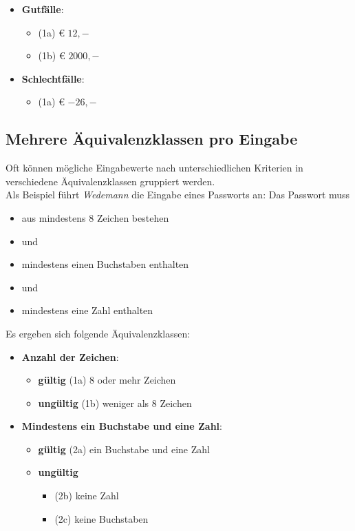 \begin{itemize}
    \item \textbf{Gutfälle}:
    \begin{itemize}
        \item (1a) € $12,-$
        \item (1b) € $2000,-$
    \end{itemize}
    \item \textbf{Schlechtfälle}:
    \begin{itemize}
        \item (1a) € $-26,-$
    \end{itemize}
\end{itemize}

\subsection*{Mehrere Äquivalenzklassen pro Eingabe}
Oft können mögliche Eingabewerte nach unterschiedlichen Kriterien in verschiedene Äquivalenzklassen gruppiert werden.\\
Als Beispiel führt \textit{Wedemann} die Eingabe eines Passworts an: Das Passwort muss
\begin{itemize}
    \item aus mindestens 8 Zeichen bestehen
    \item[] und
    \item mindestens einen Buchstaben enthalten
    \item[] und
    \item mindestens eine Zahl enthalten
\end{itemize}

\noindent
Es ergeben sich folgende Äquivalenzklassen:

\begin{itemize}
    \item \textbf{Anzahl der Zeichen}:
    \begin{itemize}
        \item[] \textbf{gültig} (1a) 8 oder mehr Zeichen
        \item[] \textbf{ungültig} (1b) weniger als 8 Zeichen
    \end{itemize}
    \item \textbf{Mindestens ein Buchstabe und eine Zahl}:
    \begin{itemize}
        \item[] \textbf{gültig} (2a) ein Buchstabe und eine Zahl
        \item[] \textbf{ungültig}
        \begin{itemize}
            \item[] (2b) keine Zahl
            \item[] (2c) keine Buchstaben
        \end{itemize}
    \end{itemize}
\end{itemize}

